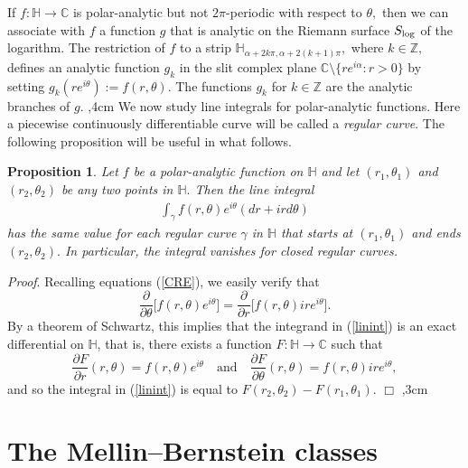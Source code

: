 \documentclass[amsmath,english,a4paper,graphicx,12pt]{article}
\begin{document}
If $f : \mathbb{H} \rightarrow \mathbb{C}$ is polar-analytic but not $2\pi$-periodic with respect to $\theta,$ then we can associate with $f$ 
a function $g$ that is analytic on the Riemann surface $S_{{\rm log}}$ of the logarithm. The restriction of $f$ to a strip 
$\mathbb{H}_{\alpha + 2k\pi, \alpha + 2(k+1)\pi},$ where $k \in \mathbb{Z},$ defines an analytic function $g_k$ in the slit complex plane 
$\mathbb{C}\setminus \{re^{i\alpha}: r>0\}$ by setting $g_k(re^{i\theta}):= f(r,\theta).$ The functions $g_k$ for $k \in \mathbb{Z}$ are 
the analytic branches of $g.$
,4cm
We now study line integrals for polar-analytic functions. Here a piecewise continuously differentiable curve will be called a {\it regular curve}. The following proposition will be useful in what follows.
\newtheorem{Proposition}{Proposition}
\begin{Proposition}\label{lineintegral}
Let $f$ be a polar-analytic function on $\mathbb{H}$ and let $(r_1, \theta_1)$ and $(r_2, \theta_2)$ be any two points in $\mathbb{H}.$ Then the line integral
\begin{eqnarray}\label{linint}
\int_\gamma f(r,\theta) e^{i\theta}(dr + ird\theta)
\end{eqnarray}
has the same value for each regular curve $\gamma$ in $\mathbb{H}$ that starts at $(r_1,\theta_1)$ and ends $(r_2,\theta_2).$ In particular, the integral vanishes for closed regular curves.
\end{Proposition}
{\it Proof}. Recalling equations (\ref{CRE}), we easily verify that
$$\frac{\partial}{\partial \theta}\bigg[f(r, \theta)e^{i\theta}\bigg] = 
\frac{\partial}{\partial r}\bigg[f(r, \theta) ir e^{i\theta}\bigg].$$
By a theorem of Schwartz, this implies that the integrand in (\ref{linint}) is an exact differential on $\mathbb{H}$, that is, there exists a function $F :\mathbb{H}\rightarrow \mathbb{C}$ such that
$$ \frac{\partial F}{\partial r}(r,\theta) = f(r, \theta)e^{i\theta}\quad \mbox{and} \quad 
\frac{\partial F}{\partial \theta}(r, \theta) = f(r,\theta) ir e^{i\theta},$$
and so the integral in (\ref{linint}) is equal to $F(r_2,\theta_2) - F(r_1, \theta_1).$ \hfill $\Box$
,3cm

\section{The Mellin--Bernstein classes}
\end{document}
